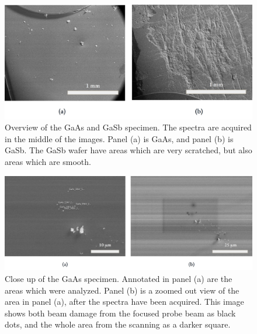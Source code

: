\begin{figure}[phtb]
    \centering
    \includegraphics[width=.99\textwidth]{figures/SE_images/Overview_GaAs_GaSb.jpg}
    \caption{
        Overview of the GaAs and GaSb specimen.
        The spectra are acquired in the middle of the images.
        Panel (a) is GaAs, and panel (b) is GaSb.
        The GaSb wafer have areas which are very scratched, but also areas which are smooth.
    }
    \label{fig:SE_images:Overview_GaAs_GaSb}
\end{figure}

\begin{figure}[phtb]
    \centering
    \includegraphics[width=.99\textwidth]{figures/SE_images/GaAs_close.jpg}
    \caption{
        Close up of the GaAs specimen.
        Annotated in panel (a) are the areas which were analyzed.
        Panel (b) is a zoomed out view of the area in panel (a), after the spectra have been acquired.
        This image shows both beam damage from the focused probe beam as black dots, and the whole area from the scanning as a darker square.
    }
    \label{fig:SE_images:GaAs}
\end{figure}


